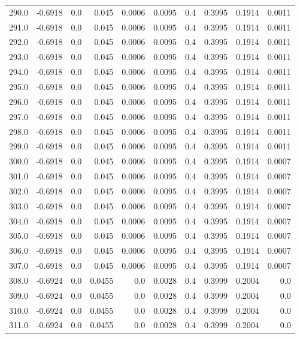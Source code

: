 \begin{longtable}{lrrrrrrrrr}
290.0 & -0.6918 & 0.0 & 0.045 & 0.0006 & 0.0095 & 0.4 & 0.3995 & 0.1914 & 0.0011 \\
291.0 & -0.6918 & 0.0 & 0.045 & 0.0006 & 0.0095 & 0.4 & 0.3995 & 0.1914 & 0.0011 \\
292.0 & -0.6918 & 0.0 & 0.045 & 0.0006 & 0.0095 & 0.4 & 0.3995 & 0.1914 & 0.0011 \\
293.0 & -0.6918 & 0.0 & 0.045 & 0.0006 & 0.0095 & 0.4 & 0.3995 & 0.1914 & 0.0011 \\
294.0 & -0.6918 & 0.0 & 0.045 & 0.0006 & 0.0095 & 0.4 & 0.3995 & 0.1914 & 0.0011 \\
295.0 & -0.6918 & 0.0 & 0.045 & 0.0006 & 0.0095 & 0.4 & 0.3995 & 0.1914 & 0.0011 \\
296.0 & -0.6918 & 0.0 & 0.045 & 0.0006 & 0.0095 & 0.4 & 0.3995 & 0.1914 & 0.0011 \\
297.0 & -0.6918 & 0.0 & 0.045 & 0.0006 & 0.0095 & 0.4 & 0.3995 & 0.1914 & 0.0011 \\
298.0 & -0.6918 & 0.0 & 0.045 & 0.0006 & 0.0095 & 0.4 & 0.3995 & 0.1914 & 0.0011 \\
299.0 & -0.6918 & 0.0 & 0.045 & 0.0006 & 0.0095 & 0.4 & 0.3995 & 0.1914 & 0.0011 \\
300.0 & -0.6918 & 0.0 & 0.045 & 0.0006 & 0.0095 & 0.4 & 0.3995 & 0.1914 & 0.0007 \\
301.0 & -0.6918 & 0.0 & 0.045 & 0.0006 & 0.0095 & 0.4 & 0.3995 & 0.1914 & 0.0007 \\
302.0 & -0.6918 & 0.0 & 0.045 & 0.0006 & 0.0095 & 0.4 & 0.3995 & 0.1914 & 0.0007 \\
303.0 & -0.6918 & 0.0 & 0.045 & 0.0006 & 0.0095 & 0.4 & 0.3995 & 0.1914 & 0.0007 \\
304.0 & -0.6918 & 0.0 & 0.045 & 0.0006 & 0.0095 & 0.4 & 0.3995 & 0.1914 & 0.0007 \\
305.0 & -0.6918 & 0.0 & 0.045 & 0.0006 & 0.0095 & 0.4 & 0.3995 & 0.1914 & 0.0007 \\
306.0 & -0.6918 & 0.0 & 0.045 & 0.0006 & 0.0095 & 0.4 & 0.3995 & 0.1914 & 0.0007 \\
307.0 & -0.6918 & 0.0 & 0.045 & 0.0006 & 0.0095 & 0.4 & 0.3995 & 0.1914 & 0.0007 \\
308.0 & -0.6924 & 0.0 & 0.0455 & 0.0 & 0.0028 & 0.4 & 0.3999 & 0.2004 & 0.0 \\
309.0 & -0.6924 & 0.0 & 0.0455 & 0.0 & 0.0028 & 0.4 & 0.3999 & 0.2004 & 0.0 \\
310.0 & -0.6924 & 0.0 & 0.0455 & 0.0 & 0.0028 & 0.4 & 0.3999 & 0.2004 & 0.0 \\
311.0 & -0.6924 & 0.0 & 0.0455 & 0.0 & 0.0028 & 0.4 & 0.3999 & 0.2004 & 0.0 \\

\end{longtable}
